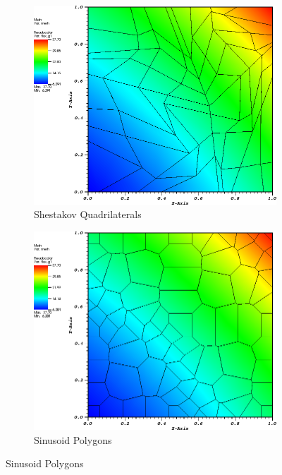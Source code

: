 \begin{figure}
{}
{
	\vspace{3mm}
	\begin{subfigure}[b]{0.465\textwidth}
		\centering
		\label{subfig::shes_quad_me_k2_lin_sol}
		\includegraphics[width=\textwidth]{figures/sec_BF/quad_sol_shesquad.png}
		\caption{Shestakov Quadrilaterals}
	\end{subfigure}
	\hfill
	\begin{subfigure}[b]{0.465\textwidth}
		\centering
		\label{subfig::smooth_poly_me_k2_lin_sol}
		\includegraphics[width=\textwidth]{figures/sec_BF/quad_sol_sinepoly.png}
		\caption{Sinusoid Polygons}

\end{subfigure}}
\end{figure}
